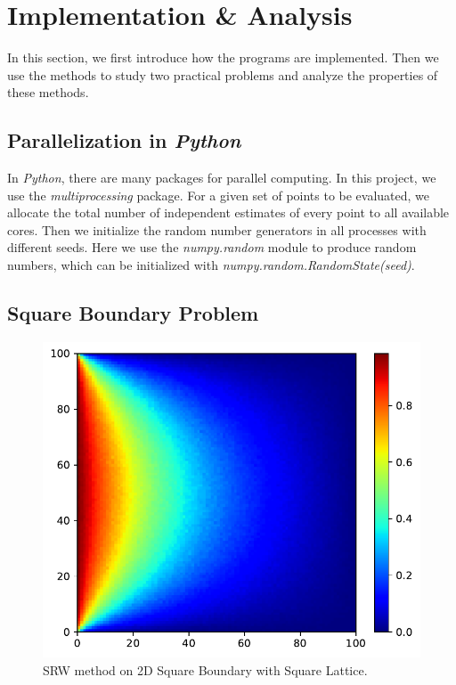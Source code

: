 \documentclass[aps, prl, preprint, groupedaddress]{revtex4-1}
\begin{document}
\section{Implementation \& Analysis}

In this section, we first introduce how the programs are implemented. Then we use the methods to study two practical problems and analyze the properties of these methods.

\subsection{Parallelization in \emph{Python}}

In \emph{Python}, there are many packages for parallel computing. In this project, we use the \emph{multiprocessing} package. For a given set of points to be evaluated, we allocate the total number of independent estimates of every point to all available cores. Then we initialize the random number generators in all processes with different seeds. Here we use the \emph{numpy.random} module to produce random numbers, which can be initialized with \emph{numpy.random.RandomState(seed)}.

\subsection{Square Boundary Problem}

\begin{figure}[htbp]
    \centering
    \includegraphics[width=.8\textwidth]{./figs/srw_s}
    \caption{\label{fig:srw_s} SRW method on 2D Square Boundary with Square Lattice.}
\end{figure}
\end{document}
